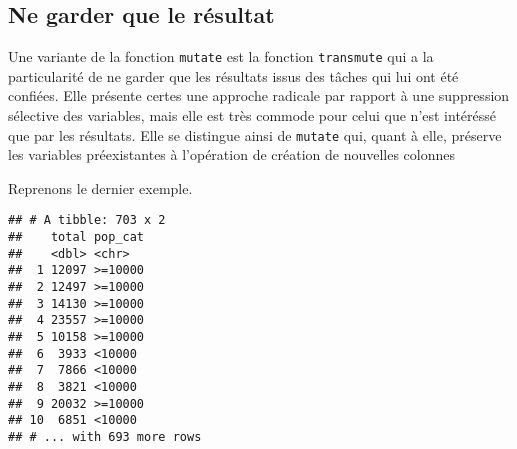 \documentclass[]{book}
\newenvironment{Shaded}{\begin{snugshade}}{\end{snugshade}}
\newcommand{\KeywordTok}[1]{\textcolor[rgb]{0.13,0.29,0.53}{\textbf{#1}}}
\newcommand{\DecValTok}[1]{\textcolor[rgb]{0.00,0.00,0.81}{#1}}
\newcommand{\StringTok}[1]{\textcolor[rgb]{0.31,0.60,0.02}{#1}}
\newcommand{\CommentTok}[1]{\textcolor[rgb]{0.56,0.35,0.01}{\textit{#1}}}
\newcommand{\OtherTok}[1]{\textcolor[rgb]{0.56,0.35,0.01}{#1}}
\newcommand{\OperatorTok}[1]{\textcolor[rgb]{0.81,0.36,0.00}{\textbf{#1}}}
\newcommand{\NormalTok}[1]{#1}
\begin{document}
\subsection{Ne garder que le résultat}\label{ne-garder-que-le-resultat}

Une variante de la fonction \texttt{mutate} est la fonction
\texttt{transmute} qui a la particularité de ne garder que les résultats
issus des tâches qui lui ont été confiées. Elle présente certes une
approche radicale par rapport à une suppression sélective des variables,
mais elle est très commode pour celui que n'est intéréssé que par les
résultats. Elle se distingue ainsi de \texttt{mutate} qui, quant à elle,
préserve les variables préexistantes à l'opération de création de
nouvelles colonnes

Reprenons le dernier exemple.

\begin{Shaded}
\end{Shaded}

\begin{verbatim}
## # A tibble: 703 x 2
##    total pop_cat
##    <dbl> <chr>  
##  1 12097 >=10000
##  2 12497 >=10000
##  3 14130 >=10000
##  4 23557 >=10000
##  5 10158 >=10000
##  6  3933 <10000 
##  7  7866 <10000 
##  8  3821 <10000 
##  9 20032 >=10000
## 10  6851 <10000 
## # ... with 693 more rows
\end{verbatim}
\end{document}
